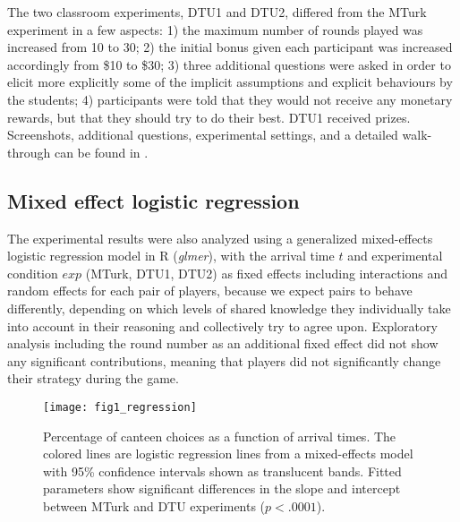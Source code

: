 The two classroom experiments, DTU1 and DTU2, differed from the MTurk experiment in a few aspects: 1) the maximum number of rounds played was increased from 10 to 30; 2) the initial bonus given each participant was increased accordingly from \$10 to \$30; 3) three additional questions were asked in order to elicit more explicitly some of the implicit assumptions and explicit behaviours by the students; 4) participants were told that they would not receive any monetary rewards, but that they should try to do their best. DTU1 received prizes. Screenshots, additional questions, experimental settings, and a detailed walk-through can be found in .

\subsection{Mixed effect logistic regression} \label{appendix:logistic} 
The experimental results were also analyzed using a generalized mixed-effects logistic regression model in R (\emph{glmer}), with the arrival time $t$ and experimental condition $exp$ (MTurk, DTU1, DTU2) as fixed effects including interactions and random effects for each pair of players, because we expect pairs to behave differently, depending on which levels of shared knowledge they individually take into account in their reasoning and collectively try to agree upon. Exploratory analysis including the round number as an additional fixed effect did not show any significant contributions, meaning that players did not significantly change their strategy during the game. %

\begin{figure} %
	\centering\texttt{[image: fig1\_regression]}
	\caption{Percentage of canteen choices as a function of arrival times. The colored lines are logistic regression lines from a mixed-effects model with 95\% confidence intervals shown as translucent bands. Fitted parameters show significant differences in the slope and intercept between MTurk and DTU experiments ($p < .0001$).}
	\label{fig:mx}
\end{figure}

